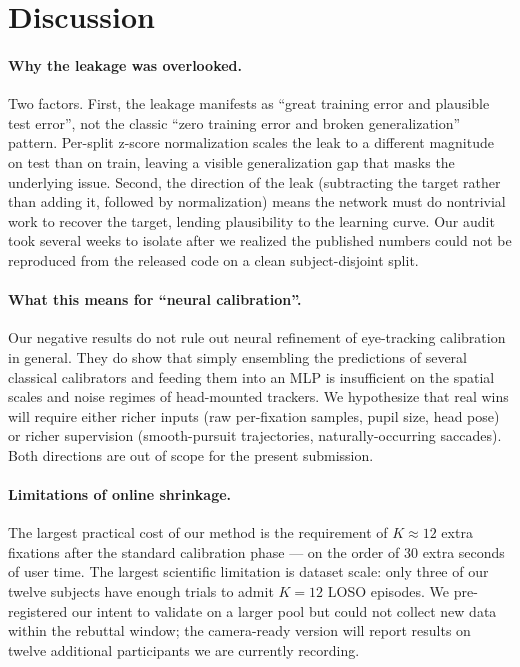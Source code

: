 \section{Discussion}
\label{sec:discussion}

\paragraph{Why the leakage was overlooked.}
Two factors. First, the leakage manifests as ``great training error and
plausible test error'', not the classic ``zero training error and broken
generalization'' pattern. Per-split z-score normalization scales the leak
to a different magnitude on test than on train, leaving a visible
generalization gap that masks the underlying issue. Second, the
direction of the leak (subtracting the target rather than adding it,
followed by normalization) means the network must do nontrivial work
to recover the target, lending plausibility to the learning curve. Our
audit took several weeks to isolate after we realized the published
numbers could not be reproduced from the released code on a clean
subject-disjoint split.

\paragraph{What this means for ``neural calibration''.}
Our negative results do not rule out neural refinement of eye-tracking
calibration in general. They do show that simply ensembling the
predictions of several classical calibrators and feeding them into an MLP
is insufficient on the spatial scales and noise regimes of head-mounted
trackers. We hypothesize that real wins will require either richer
inputs (raw per-fixation samples, pupil size, head pose) or richer
supervision (smooth-pursuit trajectories, naturally-occurring
saccades). Both directions are out of scope for the present submission.

\paragraph{Limitations of online shrinkage.}
The largest practical cost of our method is the requirement of
$K \approx 12$ extra fixations after the standard calibration phase --- on
the order of $30$ extra seconds of user time. The largest scientific
limitation is dataset scale: only three of our twelve subjects have
enough trials to admit $K=12$ LOSO episodes. We pre-registered our
intent to validate on a larger pool but could not collect new data
within the rebuttal window; the camera-ready version will report
results on twelve additional participants we are currently recording.

